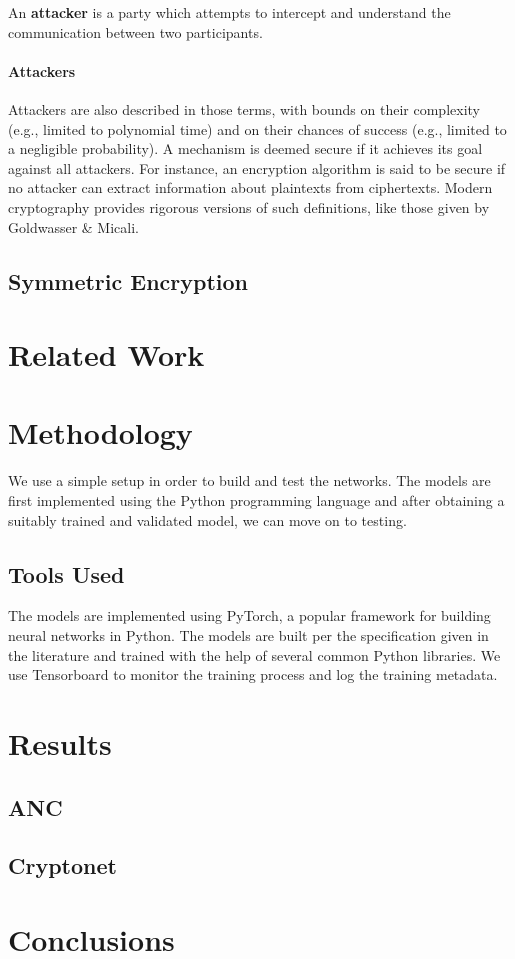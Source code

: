 \documentclass{article}
\begin{document}
    An {\bf attacker} is a party which attempts to intercept and understand the
    communication between two participants.
  
  \paragraph{Attackers}
  Attackers are also described in those terms, with bounds on their complexity 
  (e.g., limited to polynomial time) and on their chances of success 
  (e.g., limited to a negligible probability). A mechanism is deemed secure if 
  it achieves its goal against all attackers. For instance, an encryption
  algorithm is said to be secure if no attacker can extract information about 
  plaintexts from ciphertexts.
  Modern cryptography provides rigorous versions of such definitions, like those 
  given by Goldwasser \& Micali. \cite{Goldwasser}

    \subsection{Symmetric Encryption}
    

  
  \section{Related Work}
  
  \section{Methodology}
  We use a simple setup in order to build and test the networks. The models are 
  first implemented using the Python programming language and after obtaining a 
  suitably trained and validated model, we can move on to testing. 

    \subsection{Tools Used}
    The models are implemented using PyTorch, a popular framework for building
    neural networks in Python. The models are built per the specification given in
    the literature and trained with the help of several common Python libraries.
    We use Tensorboard to monitor the training process and log the training metadata.

  
  \section{Results}
    \subsection{ANC}
    \subsection{Cryptonet}
  
  \section{Conclusions}

  
  
\end{document}
